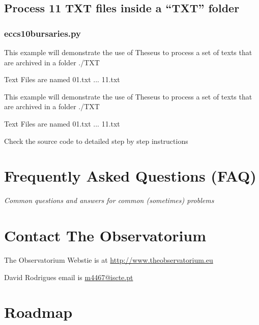 \documentclass[letterpaper,10pt,english]{sphinxmanual}
\begin{document}
\subsection{Process 11 TXT files inside a ``TXT'' folder}
\label{howto:module-theseus.examples.eccs10bursaries}\label{howto:process-11-txt-files-inside-a-txt-folder}

\subsubsection{eccs10bursaries.py}
\label{howto:eccs10bursaries-py}
This example will demonstrate the use of Theseus to process a set of texts
that are archived in a folder ./TXT

Text Files are named 01.txt ... 11.txt

\begin{fulllineitems}
\label{howto:theseus.examples.eccs10bursaries.main}
This example will demonstrate the use of Theseus to process a set of texts
that are archived in a folder ./TXT

Text Files are named 01.txt ... 11.txt

Check the source code to detailed step by step instructions

\end{fulllineitems}



\section{Frequently Asked Questions (FAQ)}
\label{faq::doc}\label{faq:frequently-asked-questions-faq}
\emph{Common questions and answers for common (sometimes) problems}


\section{Contact The Observatorium}
\label{contact::doc}\label{contact:contact-the-observatorium}
The Observatorium Webstie is at \href{http://www.theobservatorium.eu}{http://www.theobservatorium.eu}

David Rodrigues email is \href{mailto:m4467@iscte.pt}{m4467@iscte.pt}


\section{Roadmap}
\label{TODO::doc}\label{TODO:roadmap}
\end{document}
